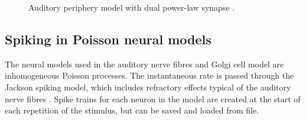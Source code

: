 



\begin{figure}[htb]
  \begin{center}
    \caption[Auditory periphery model]{Auditory periphery model with dual power-law synapse \citep[originally printed in ][]{ZilanyBruceEtAl:2009}.
\label{fig:ZilanyBruceFig}}
  \end{center}
\end{figure}



\subsection{Spiking in Poisson neural models}

The neural models used in the auditory nerve fibres and Golgi cell model are inhomogeneous Poisson processes.
The instantaneous rate is passed through the Jackson spiking model, which includes refractory effects typical of the auditory nerve fibres \citep{Jackson:2003,JacksonCarney:2005}.
Spike trains for each neuron in the model are created at the start of each repetition of the stimulus, but can be saved and loaded from file.





